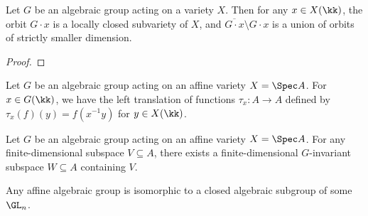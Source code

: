     \begin{proposition}\label{prop:orbit_is_locally_closed}
        Let \(G\) be an algebraic group acting on a variety \(X\).
        Then for any \(x \in X(\kk)\), the orbit \(G \cdot x\) is a locally closed subvariety of \(X\), and \(\overline{G \cdot x} \setminus G \cdot x \) is a union of orbits of strictly smaller dimension.
    \end{proposition}
    \begin{proof}
    \end{proof}


    Let \(G\) be an algebraic group acting on an affine variety \(X = \Spec A\).
    For \(x \in G(\kk)\), we have the left translation of functions \(\tau_x: A \to A\) defined by \(\tau_x(f)(y) = f(x^{-1}y)\) for \(y \in X(\kk)\).

    \begin{lemma}\label{lem:finite_dimensional_invariant_subspace}
        Let \(G\) be an algebraic group acting on an affine variety \(X = \Spec A\).
        For any finite-dimensional subspace \(V \subseteq A\), there exists a finite-dimensional \(G\)-invariant subspace \(W \subseteq A\) containing \(V\).
    \end{lemma}

    \begin{theorem}\label{thm:affine_algebraic_group_is_linear}
        Any affine algebraic group is isomorphic to a closed algebraic subgroup of some \(\GL_n\).
    \end{theorem}


